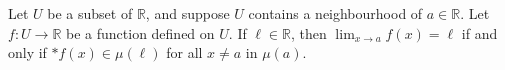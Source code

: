 Let $U$ be a subset of $\mathbb{R}$, and suppose $U$ contains a neighbourhood of $a \in \mathbb{R}$. Let $f: U \to \mathbb{R}$ be a function defined on $U$. If $\ell \in \mathbb{R}$, then $\lim_{x \to a} f(x) = \ell$ if and only if $*f(x) \in \mu(\ell)$ for all $x \neq a$ in $\mu(a)$.
